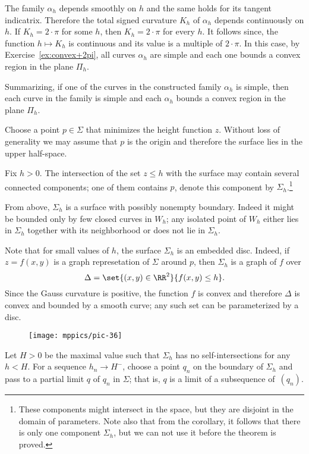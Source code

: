The family $\alpha_h$ depends smoothly on $h$ and the same holds for its tangent indicatrix.
Therefore the total signed curvature $K_h$ of $\alpha_h$ depends continuously on $h$.
If $K_h=2\cdot\pi$ for some $h$, then $K_h=2\cdot\pi$ for every $h$.
It follows since, the function $h\mapsto K_h$ is continuous and its value is a multiple of $2\cdot\pi$.
In this case, by Exercise~\ref{ex:convex+2pi}, all curves $\alpha_h$ are simple and each one bounds a convex region in the plane $\Pi_h$.

Summarizing, if one of the curves in the constructed family $\alpha_{h}$ is simple,
then each curve in the family is simple and each $\alpha_{h}$ bounds a convex region in the plane $\Pi_h$. 

Choose a point $p\in \Sigma$ that minimizes the height function $z$.
Without loss of generality we may assume that $p$ is the origin and therefore the surface lies in the upper half-space.

Fix $h>0$.
The intersection of the set $z\le h$ with the surface may contain several connected components;
one of them contains $p$, denote this component by $\Sigma_h$.\footnote{These components might intersect in the space, but they are disjoint in the domain of parameters. Note also that from the corollary, it follows that there is only one component $\Sigma_h$, but we can not use it before the theorem is proved.}


From above, $\Sigma_h$ is a surface with possibly nonempty boundary.
Indeed it might be bounded only by few closed curves in $W_h$;
any isolated point of $W_h$ either lies in $\Sigma_h$ together with its neighborhood or does not lie in $\Sigma_h$.


Note that for small values of $h$, the surface $\Sigma_h$ is an embedded disc.
Indeed, if $z=f(x,y)$ is a graph represetation of $\Sigma$ around $p$,
then $\Sigma_h$ is a graph of $f$ over 
\[\Delta=\set{(x,y)\in\RR^2}{f(x,y)\le h}.\]
Since the Gauss curvature is positive, the function $f$ is convex and therefore $\Delta$ is convex and bounded by a smooth curve;
any such set can be parameterized by a disc.

\begin{wrapfigure}{o}{30 mm}
\vskip-0mm
\centering
\texttt{[image: mppics/pic-36]}
\vskip-0mm
\end{wrapfigure}

Let $H>0$ be the maximal value such that $\Sigma_h$ has no self-intersections for any $h<H$.
For a sequence $h_n\to H^-$, choose a point $q_n$ on the boundary of $\Sigma_h$ and pass to a partial limit $q$ of $q_n$ in $\Sigma$;
that is, $q$ is a limit of a subsequence of~$(q_n)$.

